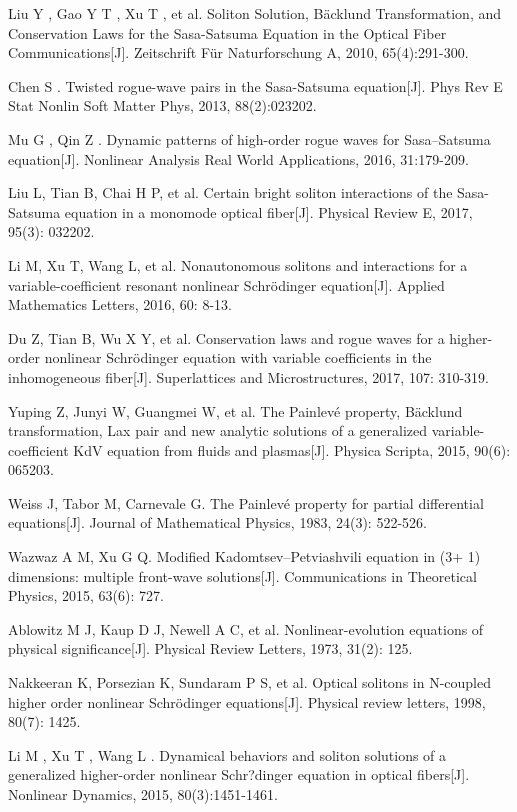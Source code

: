 \begin{thebibliography}{0}
Liu Y , Gao Y T , Xu T , et al. Soliton Solution, Bäcklund Transformation, and Conservation Laws for the Sasa-Satsuma Equation in the Optical Fiber Communications[J]. Zeitschrift Für Naturforschung A, 2010, 65(4):291-300.

Chen S . Twisted rogue-wave pairs in the Sasa-Satsuma equation[J]. Phys Rev E Stat Nonlin Soft Matter Phys, 2013, 88(2):023202.

Mu G , Qin Z . Dynamic patterns of high-order rogue waves for Sasa–Satsuma equation[J]. Nonlinear Analysis Real World Applications, 2016, 31:179-209.

Liu L, Tian B, Chai H P, et al. Certain bright soliton interactions of the Sasa-Satsuma equation in a monomode optical fiber[J]. Physical Review E, 2017, 95(3): 032202.

Li M, Xu T, Wang L, et al. Nonautonomous solitons and interactions for a variable-coefficient resonant nonlinear Schrödinger equation[J]. Applied Mathematics Letters, 2016, 60: 8-13.

Du Z, Tian B, Wu X Y, et al. Conservation laws and rogue waves for a higher-order nonlinear Schrödinger equation with variable coefficients in the inhomogeneous fiber[J]. Superlattices and Microstructures, 2017, 107: 310-319.

Yuping Z, Junyi W, Guangmei W, et al. The Painlevé property, Bäcklund transformation, Lax pair and new analytic solutions of a generalized variable-coefficient KdV equation from fluids and plasmas[J]. Physica Scripta, 2015, 90(6): 065203.

Weiss J, Tabor M, Carnevale G. The Painlevé property for partial differential equations[J]. Journal of Mathematical Physics, 1983, 24(3): 522-526.

Wazwaz A M, Xu G Q. Modified Kadomtsev–Petviashvili equation in (3+ 1) dimensions: multiple front-wave solutions[J]. Communications in Theoretical Physics, 2015, 63(6): 727.

Ablowitz M J, Kaup D J, Newell A C, et al. Nonlinear-evolution equations of physical significance[J]. Physical Review Letters, 1973, 31(2): 125.

Nakkeeran K, Porsezian K, Sundaram P S, et al. Optical solitons in N-coupled higher order nonlinear Schrödinger equations[J]. Physical review letters, 1998, 80(7): 1425.

Li M , Xu T , Wang L . Dynamical behaviors and soliton solutions of a generalized higher-order nonlinear Schr?dinger equation in optical fibers[J]. Nonlinear Dynamics, 2015, 80(3):1451-1461.


\end{thebibliography}

